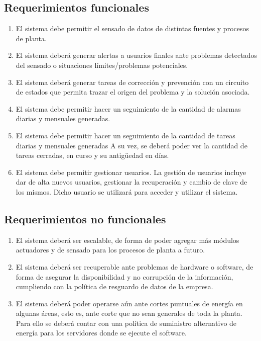 \subsection{Requerimientos funcionales}
\begin{enumerate}[label=1.\arabic*]
\item El sistema debe permitir el sensado de datos de distintas fuentes y procesos de planta.
\item El sistema deberá generar alertas a usuarios finales ante problemas detectados del sensado o situaciones límites/problemas potenciales.
\item El sistema deberá generar tareas de corrección y prevención con un circuito de estados que permita trazar el origen del problema y la solución asociada.
\item El sistema debe permitir hacer un seguimiento de la cantidad de alarmas diarias y mensuales generadas.
\item El sistema debe permitir hacer un seguimiento de la cantidad de tareas diarias y mensuales generadas A su vez, se deberá poder ver la cantidad de tareas cerradas, en curso y su antigüedad en días.
\item El sistema debe permitir gestionar usuarios. La gestión de usuarios incluye dar de alta nuevos usuarios, gestionar la recuperación y cambio de clave de los mismos. Dicho usuario se utilizará para acceder y utilizar el sistema.
\end{enumerate}
\subsection{Requerimientos no funcionales}
\begin{enumerate}[label=2.\arabic*]
\item El sistema deberá ser escalable, de forma de poder agregar más módulos actuadores y de sensado para los procesos de planta a futuro.
\item El sistema deberá ser recuperable ante problemas de hardware o software, de forma de asegurar la disponibilidad y no corrupción de la información, cumpliendo con la política de resguardo de datos de la empresa.
\item El sistema deberá poder operarse aún ante cortes puntuales de energía en algunas áreas, esto es, ante corte que no sean generales de toda la planta. Para ello se deberá contar con una política de suministro alternativo de energía para los servidores donde se ejecute el software. 
\end{enumerate}
